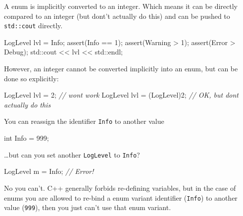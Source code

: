 \documentclass[
]{book}
\newenvironment{Shaded}{\begin{snugshade}}{\end{snugshade}}
\newcommand{\BuiltInTok}[1]{#1}
\newcommand{\CommentTok}[1]{\textcolor[rgb]{0.56,0.35,0.01}{\textit{#1}}}
\newcommand{\DataTypeTok}[1]{\textcolor[rgb]{0.13,0.29,0.53}{#1}}
\newcommand{\DecValTok}[1]{\textcolor[rgb]{0.00,0.00,0.81}{#1}}
\newcommand{\NormalTok}[1]{#1}
\newcommand{\OtherTok}[1]{\textcolor[rgb]{0.56,0.35,0.01}{#1}}
\begin{document}
A enum is implicitly converted to an integer. Which means it can be directly compared to an integer
(but dont't actually do this) and can be pushed to \texttt{std::cout} directly.

\begin{Shaded}
\begin{Highlighting}[]
\NormalTok{LogLevel lvl = Info;}
\OtherTok{assert}\NormalTok{(Info == }\DecValTok{1}\NormalTok{);}
\OtherTok{assert}\NormalTok{(Warning \textgreater{} }\DecValTok{1}\NormalTok{);}
\OtherTok{assert}\NormalTok{(Error \textgreater{} Debug);}
\BuiltInTok{std::}\NormalTok{cout \textless{}\textless{} lvl \textless{}\textless{} }\BuiltInTok{std::}\NormalTok{endl;}
\end{Highlighting}
\end{Shaded}

However, an integer cannot be converted implicitly into an enum, but can be done so explicitly:

\begin{Shaded}
\begin{Highlighting}[]
\NormalTok{LogLevel lvl = }\DecValTok{2}\NormalTok{;           }\CommentTok{// won\textquotesingle{}t work}
\NormalTok{LogLevel lvl = (LogLevel)}\DecValTok{2}\NormalTok{; }\CommentTok{// OK, but don\textquotesingle{}t actually do this}
\end{Highlighting}
\end{Shaded}

You can reassign the identifier \texttt{Info} to another value

\begin{Shaded}
\begin{Highlighting}[]
\DataTypeTok{int}\NormalTok{ Info = }\DecValTok{999}\NormalTok{;}
\end{Highlighting}
\end{Shaded}

\ldots but can you set another \texttt{LogLevel} to \texttt{Info}?

\begin{Shaded}
\begin{Highlighting}[]
\NormalTok{LogLevel m = Info; }\CommentTok{// Error!}
\end{Highlighting}
\end{Shaded}

No you can't. C++ generally forbids re-defining variables, but in the case of
enums you are allowed to re-bind a enum variant identifier (\texttt{Info}) to another
value (\texttt{999}), then you just can't use that enum variant.
\end{document}
